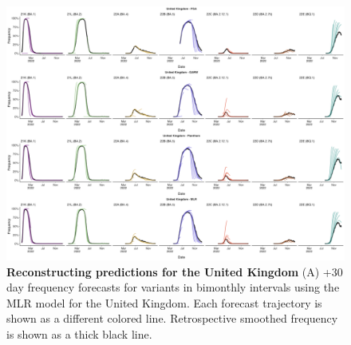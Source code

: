 \begin{figure}[th!]
	\centering
	\includegraphics[width=0.9\textwidth=0.01]{supp_figures/supplementary_fig_United Kingdom.png}
	\caption[\textbf{Reconstructing predictions for the United Kingdom}]{
		\textbf{Reconstructing predictions for the United Kingdom}
		(A) +30 day frequency forecasts for variants in bimonthly intervals using the MLR model for the United Kingdom.
		Each forecast trajectory is shown as a different colored line.
		Retrospective smoothed frequency is shown as a thick black line.
	}
	\label{fig:S6}
\end{figure}



